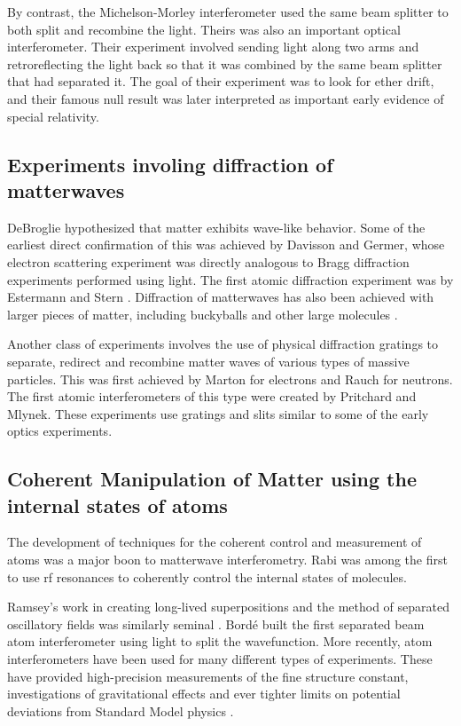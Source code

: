 By contrast, the Michelson-Morley interferometer used the same beam splitter to both split and recombine the light. Theirs was also an important optical interferometer. Their experiment involved sending light along two arms and retroreflecting the light back so that it was combined by the same beam splitter that had separated it. The goal of their experiment was to look for ether drift, and their famous null result was later interpreted as important early evidence of special relativity. 

\subsection{Experiments involing diffraction of matterwaves}
DeBroglie hypothesized that matter exhibits wave-like behavior. Some of the earliest direct confirmation of this was achieved by Davisson and Germer\cite{davisson_and_germer}, whose electron scattering experiment was directly analogous to Bragg diffraction experiments performed using light. The first atomic diffraction experiment was by Estermann and Stern \cite{esterman_stern}\cite{Kronin_RMP}. Diffraction of matterwaves has also been achieved with larger pieces of matter, including buckyballs\cite{C60_interferometry} and other large molecules \cite{large_molecule_interferometry}.

Another class of experiments involves the use of physical diffraction gratings to separate, redirect and recombine matter waves of various types of massive particles. This was first achieved by Marton\cite{electronGrating} for electrons and Rauch\cite{neutronGrating} for neutrons. The first atomic interferometers of this type were created by Pritchard\cite{pritchard1991} and Mlynek\cite{youngDoubleSlit_Carnal_Mlynek}. These experiments use gratings and slits similar to some of the early optics experiments. 

\subsection{Coherent Manipulation of Matter using the internal states of atoms}
The development of techniques for the coherent control and measurement of atoms was a major boon to matterwave interferometry\cite{Kronin_RMP}. Rabi was among the first to use rf resonances to coherently control the internal states of molecules\cite{RabiOriginal}\cite{Kronin_RMP}. 

Ramsey's work in creating long-lived superpositions and the method of separated oscillatory fields was similarly seminal \cite{Kronin_RMP}\cite{Ramsey_original}. 
Bord\'e built \cite{borde_interferometer} the first separated beam atom interferometer using light to split the wavefunction. 
More recently, atom interferometers have been used for many different types of experiments. These have provided high-precision measurements of the fine structure constant, investigations of gravitational effects and ever tighter limits on potential deviations from Standard Model physics \cite{Kronin_RMP}.

